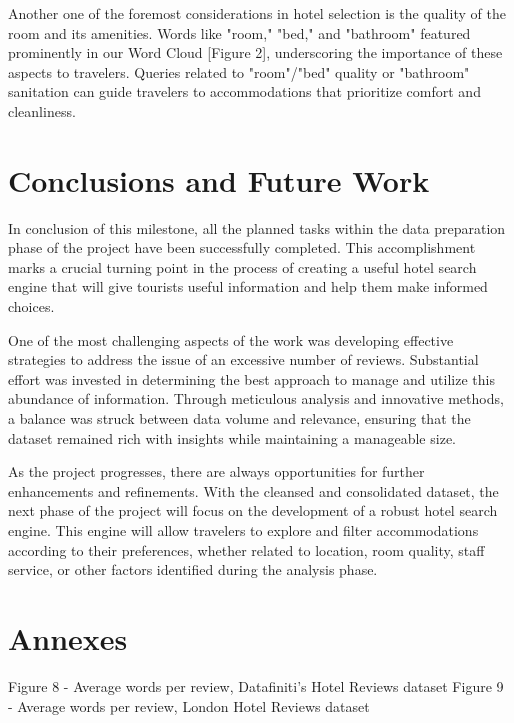 \documentclass[sigconf]{acmart}
\begin{document}
Another one of the foremost considerations in hotel selection is the quality of the room and its amenities. Words like "room," "bed," and "bathroom" featured prominently in our Word Cloud [Figure 2], underscoring the importance of these aspects to travelers. Queries related to "room"/"bed" quality or "bathroom" sanitation can guide travelers to accommodations that prioritize comfort and cleanliness.


\section{Conclusions and Future Work}

In conclusion of this milestone, all the planned tasks within the data preparation phase of the project have been successfully completed. This accomplishment marks a crucial turning point in the process of creating a useful hotel search engine that will give tourists useful information and help them make informed choices.

One of the most challenging aspects of the work was developing effective strategies to address the issue of an excessive number of reviews. Substantial effort was invested in determining the best approach to manage and utilize this abundance of information. Through meticulous analysis and innovative methods, a balance was struck between data volume and relevance, ensuring that the dataset remained rich with insights while maintaining a manageable size.

As the project progresses, there are always opportunities for further enhancements and refinements. With the cleansed and consolidated dataset, the next phase of the project will focus on the development of a robust hotel search engine. This engine will allow travelers to explore and filter accommodations according to their preferences, whether related to location, room quality, staff service, or other factors identified during the analysis phase.

\appendix

\section{Annexes}

Figure 8 - Average words per review, Datafiniti's Hotel Reviews dataset
Figure 9 - Average words per review, London Hotel Reviews dataset

\usepackage{hyperref}
\usepackage[colorlinks=true,linkcolor=blue,urlcolor=blue,citecolor=blue]{hyperref}


\newpage
\nocite{*}
\def\BibTex{BibTeX}


\end{document}
